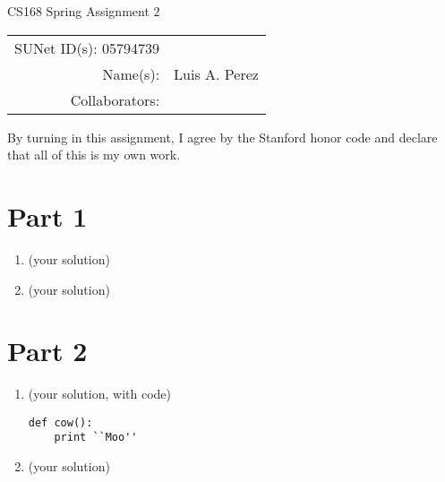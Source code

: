\documentclass[12pt]{article}
\begin{document}
\begin{center}
{\Large CS168 Spring Assignment 2}

\begin{tabular}{rl}
SUNet ID(s): 05794739 & \\
Name(s): & Luis A. Perez \\
Collaborators: &
\end{tabular}
\end{center}

By turning in this assignment, I agree by the Stanford honor code and declare
that all of this is my own work.

\section*{Part 1}

\begin{enumerate}[label=(\alph*)]
  \item (your solution)
  \item (your solution)
\end{enumerate}

\section*{Part 2}

\begin{enumerate}[label=(\alph*)]
  \item (your solution, with code)
\begin{verbatim}
def cow():
    print ``Moo''
\end{verbatim}

  \item (your solution)
\end{enumerate}
\end{document}
